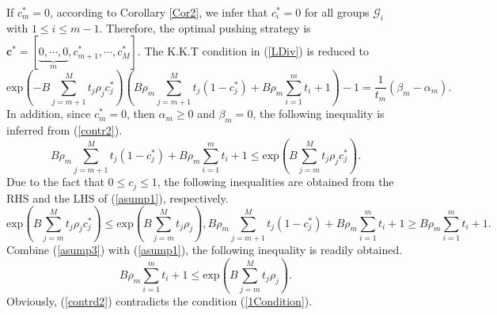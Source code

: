 \documentclass[12pt, draftclsnofoot, onecolumn]{IEEEtran}
\begin{document}
If $c_m^{\ast}=0$, according to Corollary \ref{Cor2}, we infer that $c_i^{\ast}=0$ for all groups $\mathcal{G}_i$ with $1\leq i \leq m-1$. Therefore, the optimal pushing strategy is $\bm{c}^{\ast} =[\underbrace{0, \cdots, 0}_{m}, c_{m+1}^{\ast}, \cdots, c_{M}^{\ast}]$. The K.K.T condition in (\ref {LDiv}) is reduced to
\begin{equation}\label{contr2}
\textrm{exp}(-B \sum\limits_{j=m+1}^{M} t_j \rho_j c_j^{\ast})\left( B \rho_m\sum\limits_{j=m+1}^{M} t_j (1-c_j^{\ast}) +B \rho_m\sum\limits_{i=1}^{m} t_i + 1\right) - 1=\frac{1}{t_m} (\beta_m-\alpha_m).
\end{equation}
In addition, since $c_m^{\ast}=0$, then $\alpha_m\geq 0$ and $\beta_m=0$, the following inequality is inferred from (\ref{contr2}).
\begin{equation}\label{asump1}
B \rho_m\sum\limits_{j= m+1}^{M} t_j (1-c_j^{\ast}) +B \rho_m\sum\limits_{i=1}^{m} t_i + 1 \leq \textrm{exp}\left(B \sum\limits_{j= m}^{M} t_j \rho_j c_j^{\ast}\right).
\end{equation}
Due to the fact that $0 \leq c_j \leq 1$, the following inequalities are obtained from the RHS and the LHS of (\ref{asump1}), respectively.
\begin{equation}
\textrm{exp}\left(B \sum\limits_{j= m}^{M} t_j \rho_j c_j^{\ast}\right) \leq \textrm{exp}\left(B \sum\limits_{j= m}^{M} t_j \rho_j\right), %
B \rho_m\sum\limits_{j= m+1}^{M} t_j (1-c_j^{\ast}) +B \rho_m\sum\limits_{i=1}^{m} t_i + 1 \geq B \rho_m\sum\limits_{i=1}^{m} t_i + 1 \label{asump3}.
\end{equation}
Combine (\ref{asump3}) with  (\ref{asump1}), the following inequality is readily obtained.
\begin{equation}\label{contrd2}
B \rho_m\sum\limits_{i=1}^{m} t_i + 1 \leq  \textrm{exp}\left(B \sum\limits_{j= m}^{M} t_j \rho_j\right).
\end{equation}
Obviously, (\ref{contrd2}) contradicts the condition (\ref{1Condition}).
\end{document}
